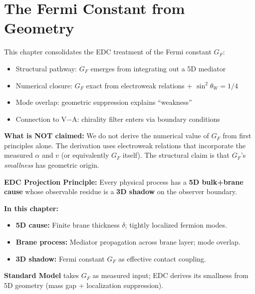 
\section{The Fermi Constant from Geometry}
\label{sec:ch11_gf}

\begin{tcolorbox}[edcGuardrail, title=\textbf{Epistemic Status}]
This chapter consolidates the EDC treatment of the Fermi constant $G_F$:
\begin{itemize}[nosep]
    \item Structural pathway: $G_F$ emerges from integrating out a 5D mediator \tagDc{}
    \item Numerical closure: $G_F$ exact from electroweak relations + $\sin^2\theta_W = 1/4$ \tagDc{}
    \item Mode overlap: geometric suppression explains ``weakness'' \tagP{}
    \item Connection to V$-$A: chirality filter enters via boundary conditions \tagDc{}
\end{itemize}
\textbf{What is NOT claimed:} We do not derive the numerical value of $G_F$
from first principles alone. The derivation uses electroweak relations that
incorporate the measured $\alpha$ and $v$ (or equivalently $G_F$ itself).
The structural claim is that $G_F$'s \emph{smallness} has geometric origin.
\end{tcolorbox}

\begin{tcolorbox}[colback=blue!3!white, colframe=blue!50!black,
    title=\textbf{Framework 2.0 Language Compliance}]
\small
\textbf{EDC Projection Principle:} Every physical process has a \textbf{5D bulk+brane cause}
whose observable residue is a \textbf{3D shadow} on the observer boundary.

\textbf{In this chapter:}
\begin{itemize}[nosep]
    \item \textbf{5D cause:} Finite brane thickness $\delta$; tightly localized fermion modes.
    \item \textbf{Brane process:} Mediator propagation across brane layer; mode overlap.
    \item \textbf{3D shadow:} Fermi constant $G_F$ as effective contact coupling.
\end{itemize}

\textbf{Standard Model} takes $G_F$ as measured input; EDC derives its smallness from
5D geometry (mass gap + localization suppression).
\end{tcolorbox}

